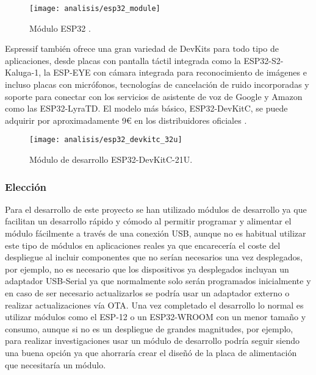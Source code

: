 \documentclass[../proyecto.tex]{subfiles}
\begin{document}
\begin{figure}[H]
\centering
\texttt{[image: analisis/esp32\_module]}
\caption{Módulo ESP32  \cite{esp32_module}.}
\label{fig:esp32_module}
\end{figure}

Espressif también ofrece una gran variedad de DevKits para todo tipo de aplicaciones, desde placas con pantalla táctil integrada como la ESP32-S2-Kaluga-1, la ESP-EYE con cámara integrada para reconocimiento de imágenes e incluso placas con micrófonos, tecnologías de cancelación de ruido incorporadas y soporte para conectar con los servicios de asistente de voz de Google y Amazon como las ESP32-LyraTD. El modelo más básico, ESP32-DevKitC, se puede adquirir por aproximadamente 9€ en los distribuidores oficiales \cite{espressif_provider_digikey} \cite{espressif_provider_mouser}.\\

\begin{figure}[H]
\centering
\texttt{[image: analisis/esp32\_devkitc\_32u]}
\caption{Módulo de desarrollo ESP32-DevKitC-21U.}
\label{fig:esp32_devkitc_32u}
\end{figure}

\subsubsection{Elección}

Para el desarrollo de este proyecto se han utilizado módulos de desarrollo ya que facilitan un desarrollo rápido y cómodo al permitir programar y alimentar el módulo fácilmente a través de una conexión USB, aunque no es habitual utilizar este tipo de módulos en aplicaciones reales ya que encarecería el coste del despliegue al incluir componentes que no serían necesarios una vez desplegados, por ejemplo, no es necesario que los dispositivos ya desplegados incluyan un adaptador USB-Serial ya que normalmente solo serán programados inicialmente y en caso de ser necesario actualizarlos se podría usar un adaptador externo o realizar actualizaciones vía OTA. Una vez completado el desarrollo lo normal es utilizar módulos como el ESP-12 o un ESP32-WROOM con un menor tamaño y consumo, aunque si no es un despliegue de grandes magnitudes, por ejemplo, para realizar investigaciones usar un módulo de desarrollo podría seguir siendo una buena opción ya que ahorraría crear el diseñó de la placa de alimentación que necesitaría un módulo.\\
\end{document}
